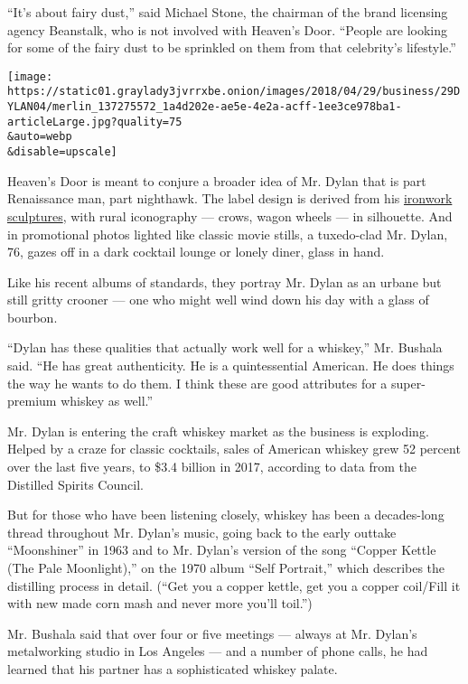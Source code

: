 ``It's about fairy dust,'' said Michael Stone, the chairman of the brand
licensing agency Beanstalk, who is not involved with Heaven's Door.
``People are looking for some of the fairy dust to be sprinkled on them
from that celebrity's lifestyle.''

\texttt{[image: https://static01.graylady3jvrrxbe.onion/images/2018/04/29/business/29DYLAN04/merlin\_137275572\_1a4d202e-ae5e-4e2a-acff-1ee3ce978ba1-articleLarge.jpg?quality=75\\\&auto=webp\\\&disable=upscale]}

Heaven's Door is meant to conjure a broader idea of Mr. Dylan that is
part Renaissance man, part nighthawk. The label design is derived from
his
\href{https://www.nytimes3xbfgragh.onion/2016/09/08/arts/music/bob-dylan-iron-archway-casino.html}{ironwork
sculptures}, with rural iconography --- crows, wagon wheels --- in
silhouette. And in promotional photos lighted like classic movie stills,
a tuxedo-clad Mr. Dylan, 76, gazes off in a dark cocktail lounge or
lonely diner, glass in hand.

Like his recent albums of standards, they portray Mr. Dylan as an urbane
but still gritty crooner --- one who might well wind down his day with a
glass of bourbon.

``Dylan has these qualities that actually work well for a whiskey,'' Mr.
Bushala said. ``He has great authenticity. He is a quintessential
American. He does things the way he wants to do them. I think these are
good attributes for a super-premium whiskey as well.''

Mr. Dylan is entering the craft whiskey market as the business is
exploding. Helped by a craze for classic cocktails, sales of American
whiskey grew 52 percent over the last five years, to \$3.4 billion in
2017, according to data from the Distilled Spirits Council.

But for those who have been listening closely, whiskey has been a
decades-long thread throughout Mr. Dylan's music, going back to the
early outtake ``Moonshiner'' in 1963 and to Mr. Dylan's version of the
song ``Copper Kettle (The Pale Moonlight),'' on the 1970 album ``Self
Portrait,'' which describes the distilling process in detail. (``Get you
a copper kettle, get you a copper coil/Fill it with new made corn mash
and never more you'll toil.'')

Mr. Bushala said that over four or five meetings --- always at Mr.
Dylan's metalworking studio in Los Angeles --- and a number of phone
calls, he had learned that his partner has a sophisticated whiskey
palate.

